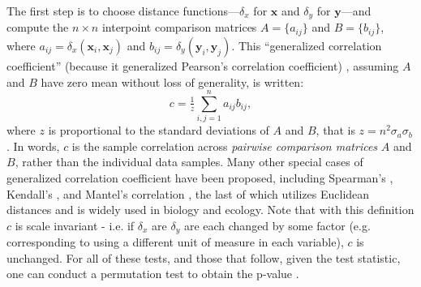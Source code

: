 \documentclass[11pt]{article}
\providecommand{\mb}[1]{\boldsymbol{#1}}
\newcommand{\G}{c}
\newcommand{\mbx}{\ensuremath{\mb{x}}}
\begin{document}
The first step is to choose  distance functions---$\delta_x$ for $\mbx$ and $\delta_y$ for $\mb{y}$---and compute the $n \times n$ interpoint comparison matrices $A=\{a_{ij}\}$ and $B=\{b_{ij}\}$, where $a_{ij}=\delta_x(\mb{x}_i,\mb{x}_j)$ and  $b_{ij}=\delta_y(\mb{y}_i,\mb{y}_j)$.  
This ``generalized correlation coefficient'' (because it generalized Pearson's correlation coefficient) \cite{KendallBook}, assuming $A$ and $B$ have zero mean without loss of generality, is written:
\begin{equation}
\label{generalCoef}
\G= \tfrac{1}{z} {\textstyle \sum_{i,j=1}^n a_{ij} b_{ij}},
\end{equation}
%
%
where $z$ is proportional to the standard deviations of $A$ and $B$, that is $z=n^2\sigma_a \sigma_b$.
In words, $\G$ is the sample correlation across \emph{pairwise comparison matrices} $A$ and $B$, rather than the individual data samples.  
Many other special cases of generalized correlation coefficient have been proposed, including  Spearman's \cite{Spearman1904},  Kendall's \cite{KendallBook}, and Mantel's correlation \cite{Mantel1967}, the last of which utilizes Euclidean distances and is widely used in biology and ecology.
Note that with this definition $\G$ is scale invariant - i.e. if $\delta_x$ are $\delta_y$ are each changed by some factor (e.g. corresponding to using a different unit of measure in each variable), $\G$ is unchanged.
For all of these tests, and those that follow, given the test statistic, one can conduct a permutation test to obtain the p-value \cite{GoodPermutationBook}.
\end{document}
